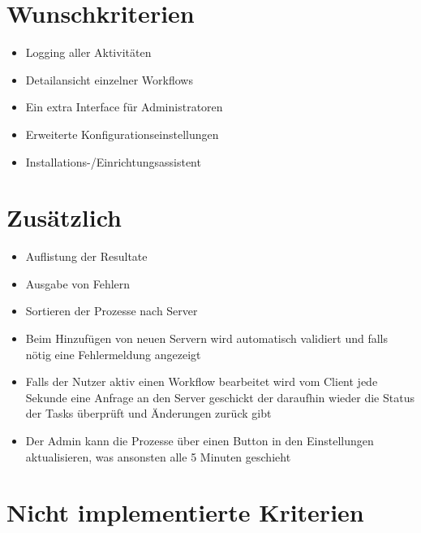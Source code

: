     \section{Wunschkriterien}
    
        \begin{itemize}
			\item Logging aller Aktivitäten
			\item Detailansicht einzelner Workflows
			\item Ein extra Interface für Administratoren
			\item Erweiterte Konfigurationseinstellungen
			\item Installations-/Einrichtungsassistent
		\end{itemize}
    
    \section{Zusätzlich}
    
        \begin{itemize}
            \item Auflistung der Resultate
            \item Ausgabe von Fehlern
            \item Sortieren der Prozesse nach Server
            \item Beim Hinzufügen von neuen Servern wird automatisch validiert und falls nötig eine Fehlermeldung angezeigt
            \item Falls der Nutzer aktiv einen Workflow bearbeitet wird vom Client jede Sekunde eine Anfrage an den Server geschickt der daraufhin wieder die Status der Tasks überprüft und Änderungen zurück gibt
            \item Der Admin kann die Prozesse über einen Button in den Einstellungen aktualisieren, was ansonsten alle 5 Minuten geschieht
        \end{itemize}


    \section{Nicht implementierte Kriterien}
        
